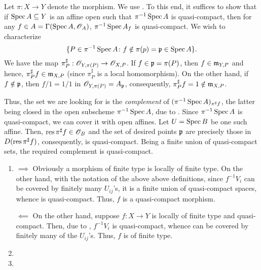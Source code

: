 \begin{exercise}
    Let $\pi: X\to Y$ denote the morphism. We use . To this end, it suffices to show that if $\operatorname{Spec} A\subseteq Y$ is an affine open such that $\pi^{-1}\operatorname{Spec} A$ is quasi-compact, then for any $f\in A = \Gamma(\operatorname{Spec} A, \mathscr{O}_{A})$, $\pi^{-1}\operatorname{Spec} A_f$ is quasi-compact. We wish to characterize 
    \begin{equation*}
        \{P\in\pi^{-1}\operatorname{Spec} A\colon f\notin\pi(p) = \mathfrak{p}\in\operatorname{Spec} A\}.
    \end{equation*}
    We have the map $\pi^\sharp_P:\mathscr{O}_{Y,\pi(P)}\to\mathscr{O}_{X, P}$. If $f\in\mathfrak{p} = \pi(P)$, then $f\in\mathfrak{m}_{Y, P}$ and hence, $\pi^\sharp_Pf\in\mathfrak{m}_{X, P}$ (since $\pi^\sharp_P$ is a local homomorphism). On the other hand, if $f\notin\mathfrak{p}$, then $f/1 = 1/1$ in $\mathscr{O}_{Y,\pi(P)} = A_{\mathfrak{p}}$,  consequently, $\pi^\sharp_Pf = 1\notin\mathfrak{m}_{X, P}$.

    Thus, the set we are looking for is the \emph{complement} of $(\pi^{-1}\operatorname{Spec} A)_{\pi^\sharp f}$, the latter being closed in the open subscheme $\pi^{-1}\operatorname{Spec} A$, due to . Since $\pi^{-1}\operatorname{Spec} A$ is quasi-compact, we can cover it with open affines. Let $U = \operatorname{Spec} B$ be one such affine. Then, $\operatorname{res}\pi^\sharp f\in\mathscr{O}_B$ and the set of desired points $\mathfrak{p}$ are precisely those in $D(\operatorname{res}\pi^\sharp f)$,  consequently, is quasi-compact. Being a finite union of quasi-compact sets, the required complement is quasi-compact.
\end{exercise}

\begin{exercise}\hfill 
\begin{enumerate}[label=(\alph*)]
\item $\implies$ Obviously a morphism of finite type is locally of finite type. On the other hand, with the notation of the above above definitions, since $f^{-1}V_i$ can be covered by finitely many $U_{ij}$'s, it is a finite union of quasi-compact spaces, whence is quasi-compact. Thus, $f$ is a quasi-compact morphism.

$\impliedby$ On the other hand, suppose $f: X\to Y$ is locally of finite type and quasi-compact. Then, due to , $f^{-1}V_i$ is quasi-compact, whence can be covered by finitely many of the $U_{ij}$'s. Thus, $f$ is of finite type.

\item 

\item 
\end{enumerate}
\end{exercise}


